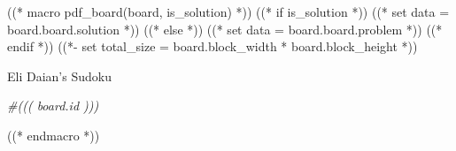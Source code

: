 ((* macro pdf_board(board, is_solution) *))
    ((* if is_solution *))
        ((* set data = board.board.solution *))
    ((* else *))
        ((* set data = board.board.problem *))
    ((* endif *))
    ((*- set total_size = board.block_width * board.block_height *))

    \pagestyle{empty}
    \begin{center}
    {\huge Eli Daian's Sudoku}

    \vspace{1em}


    \emph{\#((( board.id )))}
    \end{center}
((* endmacro *))

\documentclass[a4paper, oneside]{article}
\usepackage[margin=2cm]{geometry}
\usepackage{tikz}



((*- if multi_board *))
    ((*- for board in boards *))
        ((( pdf_board(board, is_solution) )))
        \pagebreak
    ((*- endfor *))
((*- else *))
    ((( pdf_board(board, is_solution) )))
((*- endif *))


